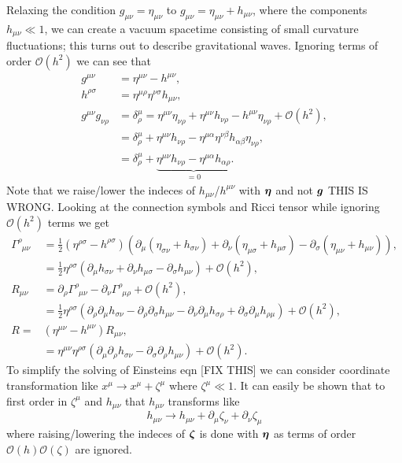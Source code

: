 Relaxing the condition $g_{\mu\nu}=\eta_{\mu\nu}$ to $g_{\mu\nu}=\eta_{\mu\nu}+h_{\mu\nu}$, where the components $h_{\mu\nu} \ll 1$, we can create a vacuum spacetime consisting of small curvature fluctuations; this turns out to describe gravitational waves. Ignoring terms of order $\mathcal{O}(h^2)$ we can see that
\begin{align}
g^{\mu\nu} &= \eta^{\mu\nu} - h^{\mu\nu}, \\
h^{\rho\sigma} &= \eta^{\mu\rho}\eta^{\nu\sigma}h_{\mu\nu},\\
g^{\mu\nu}g_{\nu\rho} &= \delta^\mu_\rho =\eta^{\mu\nu}\eta_{\nu\rho} +\eta^{\mu\nu}h_{\nu\rho} - h^{\mu\nu}\eta_{\nu\rho} + \mathcal{O}(h^2),\\
                      &= \delta^\mu_\rho +\eta^{\mu\nu}h_{\nu\rho} - \eta^{\mu\alpha}\eta^{\nu\beta} h_{\alpha\beta}\eta_{\nu\rho},\\
                      &= \delta^\mu_\rho +\underbrace{\eta^{\mu\nu}h_{\nu\rho} - \eta^{\mu\alpha} h_{\alpha\rho}}_{=0}.
\end{align}
Note that we raise/lower the indeces of $h_{\mu\nu}$/$h^{\mu\nu}$ with $\boldsymbol{\eta}$ and not $\boldsymbol{g}$ THIS IS WRONG. Looking at the connection symbols and Ricci tensor while ignoring $\mathcal{O}(h^2)$ terms we get
\begin{align}
\Gamma^{\rho}_{\,\,\,\mu\nu} &= \frac{1}{2}\left(\eta^{\rho\sigma}-h^{\rho\sigma}\right)\left( \partial_\mu(\eta_{\sigma\nu}+h_{\sigma\nu}) + \partial_\nu(\eta_{\mu\sigma}+h_{\mu\sigma})-\partial_\sigma(\eta_{\mu\nu}+h_{\mu\nu}) \right),\\
                             &=\frac{1}{2}\eta^{\rho\sigma}\left( \partial_\mu h_{\sigma\nu} + \partial_\nu h_{\mu\sigma}-\partial_\sigma h_{\mu\nu} \right) + \mathcal{O}(h^2),\\
                  R_{\mu\nu}& = \partial_{\rho}\Gamma^{\rho}_{\,\,\,\mu \nu}-\partial_{\nu}\Gamma^{\rho}_{\,\,\,\mu \rho} + \mathcal{O}(h^2),\\
                            & = \frac{1}{2}\eta^{\rho\sigma}\left( \partial_\rho \partial_\mu h_{\sigma\nu} - \partial_\rho \partial_\sigma h_{\mu\nu}  - \partial_\nu \partial_\mu h_{\sigma\rho} +  \partial_\sigma \partial_\mu h_{\rho\mu} \right) +\mathcal{O}(h^2),\\
                        R=& ({\eta^{\mu\nu}-h^{\mu\nu}})R_{\mu\nu},\\
                          &= \eta^{\mu\nu}\eta^{\rho\sigma}(\partial_\mu \partial_\rho h_{\sigma \nu} - \partial_\sigma \partial_\rho h_{\mu\nu}) +\mathcal{O}(h^2).
\end{align}
To simplify the solving of Einsteins eqn [FIX THIS] we can consider coordinate transformation like $x^\mu \rightarrow x^\mu + \zeta^\mu$ where $\zeta^\mu\ll1$. It can easily be shown that to first order in $\zeta^\mu$ and $h_{\mu\nu}$ that $h_{\mu\nu}$ transforms like 
\begin{equation}
h_{\mu\nu} \rightarrow h_{\mu\nu} + \partial_{\mu}\zeta_\nu + \partial_\nu \zeta_\mu
\end{equation} 
where raising/lowering the indeces of $\boldsymbol{\zeta}$ is done with $\boldsymbol{\eta}$ as terms of order $\mathcal{O}(h)\mathcal{O}(\zeta)$ are ignored.


